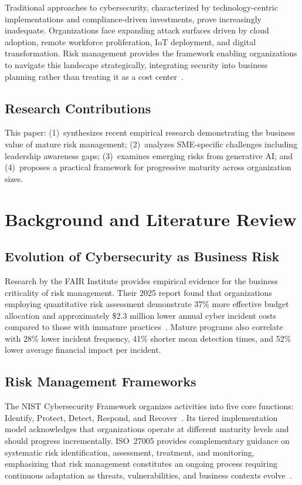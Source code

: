 \documentclass[journal]{IEEEtran}
\begin{document}
Traditional approaches to cybersecurity, characterized by technology-centric
implementations and compliance-driven investments, prove increasingly inadequate.
Organizations face expanding attack surfaces driven by cloud adoption, remote workforce
proliferation, IoT deployment, and digital transformation. Risk management provides the
framework enabling organizations to navigate this landscape strategically, integrating
security into business planning rather than treating it as a cost center~\cite{nist2018framework}.

\subsection{Research Contributions}

This paper: (1)~synthesizes recent empirical research demonstrating the business value of
mature risk management; (2)~analyzes SME-specific challenges including leadership
awareness gaps; (3)~examines emerging risks from generative AI; and (4)~proposes a
practical framework for progressive maturity across organization sizes.

\section{Background and Literature Review}

\subsection{Evolution of Cybersecurity as Business Risk}

Research by the FAIR Institute provides empirical evidence for the business criticality
of risk management. Their 2025 report found that organizations employing quantitative
risk assessment demonstrate 37\% more effective budget allocation and approximately
\$2.3 million lower annual cyber incident costs compared to those with immature
practices~\cite{fairinstitute2025}. Mature programs also correlate with 28\% lower
incident frequency, 41\% shorter mean detection times, and 52\% lower average financial
impact per incident.

\subsection{Risk Management Frameworks}

The NIST Cybersecurity Framework organizes activities into five core functions:
Identify, Protect, Detect, Respond, and Recover~\cite{nist2018framework}. Its tiered
implementation model acknowledges that organizations operate at different maturity levels
and should progress incrementally. ISO~27005 provides complementary guidance on
systematic risk identification, assessment, treatment, and monitoring, emphasizing that
risk management constitutes an ongoing process requiring continuous adaptation as threats,
vulnerabilities, and business contexts evolve~\cite{iso27005}.
\end{document}
